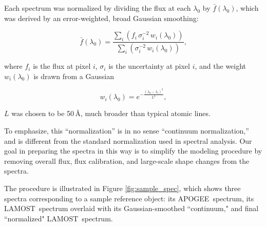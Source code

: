 \documentclass[12pt, letterpaper, preprint]{aastex}
\newcommand{\apogee}{APOGEE}
\newcommand{\lamost}{LAMOST}
\begin{document}
Each spectrum was normalized by dividing the flux at each $\lambda_0$ by $\bar{f} (\lambda_0)$, which was
derived by an error-weighted, broad Gaussian smoothing:

\begin{equation}
\bar{f}(\lambda_0) = \frac{\sum_i (f_i\,\sigma^{-2}_i\,w_i(\lambda_0))}{\sum_i (\sigma^{-2}_i\,w_i(\lambda_0))},
\end{equation}

\noindent where $f_i$ is the flux at pixel $i$, $\sigma_i$ is the uncertainty at pixel $i$, and the weight $w_i (\lambda_0)$ is drawn from a Gaussian 

\begin{equation}
w_i(\lambda_0) = e^{-\frac{(\lambda_0-\lambda_i)^2}{L^2}},
\end{equation}

\noindent $L$ was chosen to be 50\,$\mbox{\AA}$,
much broader than typical atomic lines. 

To emphasize, this ``normalization'' is in no sense
``continuum normalization,'' and is
different from the standard normalization used in
spectral analysis. Our goal in preparing the spectra in this way is to simplify the modeling procedure by removing overall flux, flux calibration, and large-scale shape changes from the spectra.

The procedure is illustrated in Figure \ref{fig:sample_spec}, 
which shows three spectra corresponding to a sample reference object: 
its \apogee\ spectrum, its \lamost\ spectrum overlaid with its Gaussian-smoothed  ``continuum," and final ``normalized" \lamost\ spectrum. 
\end{document}
